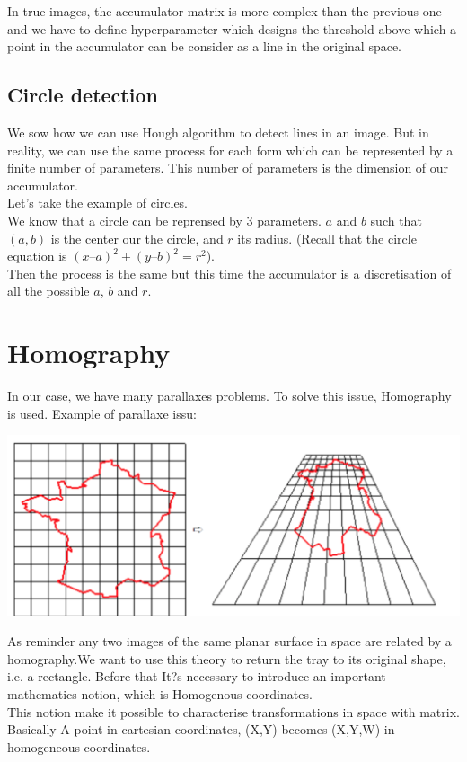 \documentclass{article}
\begin{document}
In true images, the accumulator matrix is more complex than the previous one and we have to define hyperparameter which designs the threshold above which a point in the accumulator can be consider as a line in the original space.

\subsection{Circle detection}

We sow how we can use Hough algorithm to detect lines in an image. But in reality, we can use the same process for each form which can be represented by a finite number of parameters. This number of parameters is the dimension of our accumulator. \\
Let's take the example of circles.\\
We know that a circle can be reprensed by $3$ parameters. $a$ and $b$ such that $(a, b)$ is the center our the circle, and $r$ its radius. (Recall that the circle equation is $(x – a)^2 + (y – b)^2 = r^2$).\\
Then the process is the same but this time the accumulator is a discretisation of all the possible $a$, $b$ and $r$.
\newpage

\section{Homography}
In our case, we have many parallaxes problems. To solve this issue, Homography is used.
Example of parallaxe issu:
\begin{center}
    \includegraphics[scale=0.7]{images/parallax.png}    
\end{center}
\vspace{0.5 cm}

As reminder any two images of the same planar surface in space are related by a homography.We want to use this theory to return the tray to its original shape, i.e. a rectangle.
Before that It?s necessary to introduce an important mathematics notion, which is Homogenous coordinates.\\
This notion make it possible to characterise transformations in space with matrix.
Basically A point in cartesian coordinates, (X,Y) becomes  (X,Y,W)  in homogeneous coordinates.
\vspace{0.5 cm}
\end{document}
